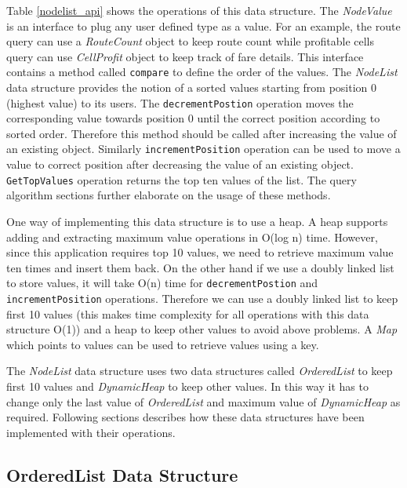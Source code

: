 Table \ref{nodelist_api} shows the operations of this data structure. The \textit{NodeValue} is an interface to plug any user defined type as a value. For an example, the route query can use a \textit{RouteCount} object to keep route count while profitable cells query can use \textit{CellProfit} object to keep track of fare details. This interface contains a method called \texttt{compare} to define the order of the values. The \textit{NodeList} data structure provides the notion of a sorted values starting from position 0 (highest value) to its users. The \texttt{decrementPostion} operation moves the corresponding value towards position 0 until the correct position according to sorted order. Therefore this method should be called after increasing the value of an existing object. Similarly \texttt{incrementPosition} operation can be used to move a value to correct position after decreasing the value of an existing object. \texttt{GetTopValues} operation returns the top ten values of the list. The query algorithm sections further elaborate on the usage of these methods.

One way of implementing this data structure is to use a heap. A heap supports adding and extracting maximum value operations in O(log n) time. However, since this application requires top 10 values, we need to retrieve maximum value ten times and insert them back. On the other hand if we use a doubly linked list to store values, it will take O(n) time for  \texttt{decrementPostion} and \texttt{incrementPosition} operations. Therefore we can use a doubly linked list to keep first 10 values (this makes time complexity for all operations with this data structure O(1)) and a heap to keep other values to avoid above problems.  A \textit{Map} which points to values can be used to retrieve values using a key.

The \textit{NodeList} data structure uses two data structures called \textit{OrderedList} to keep first 10 values and \textit{DynamicHeap} to keep other values. In this way it has to change only the last value of \textit{OrderedList} and maximum value of \textit{DynamicHeap} as required. Following sections describes how these data structures have been implemented with their operations.

\subsection{OrderedList Data Structure}

